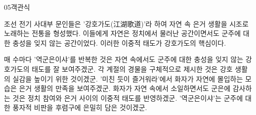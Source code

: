 \documentclass[fs85,seriesWit]{korfarm-base}
\begin{document}
\begin{kfQBlock}{05}{객관식}
\begin{kfEvidence}조선 전기 사대부 문인들은 '강호가도(江湖歌道)'라 하여 자연 속 은거 생활을 시조로 노래하는 전통을 형성했다. 이들에게 자연은 정치에서 물러난 공간이면서도 군주에 대한 충성을 잊지 않는 공간이었다. 이러한 이중적 태도가 강호가도의 핵심이다.\end{kfEvidence}
\begin{kfChoices}
\kfChoice 매 수마다 '역군은이샤'를 반복한 것은 자연 속에서도 군주에 대한 충성을 잊지 않는 강호가도의 태도를 잘 보여주겠군.
\kfChoice 각 계절의 경물을 구체적으로 제시한 것은 강호 생활의 실감을 높이기 위한 것이겠군.
\kfChoice '미친 듯이 즐거워라'에서 화자가 자연에 몰입하는 모습은 은거 생활의 만족을 보여주겠군.
\kfChoice 화자가 자연 속에서 소일하면서도 군은에 감사하는 것은 정치 참여와 은거 사이의 이중적 태도를 반영하겠군.
\kfChoice '역군은이샤'는 군주에 대한 풍자적 비판을 후렴구에 은밀히 담은 것이겠군.
\end{kfChoices}
\end{kfQBlock}

\kfEndMC
\end{document}
